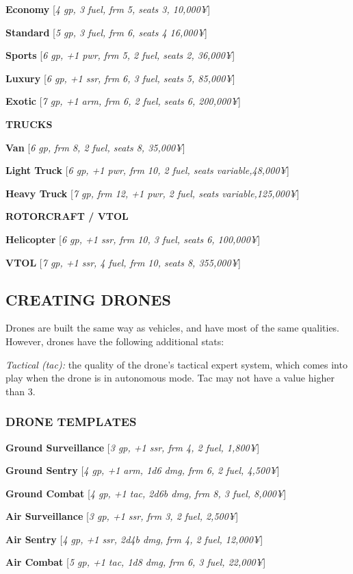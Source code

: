 \documentclass[oneside,10pt]{article}
\begin{document}
\begin{multicols}{2}
\textbf{Economy} [\textit{4 gp, 3 fuel, frm 5, seats 3, 10,000¥}]

\textbf{Standard} [\textit{5 gp, 3 fuel, frm 6, seats 4 16,000¥}]

\textbf{Sports} [\textit{6 gp, +1 pwr, frm 5, 2 fuel, seats 2, 36,000¥}]

\textbf{Luxury} [\textit{6 gp, +1 ssr, frm 6, 3 fuel, seats 5, 85,000¥}]

\textbf{Exotic} [\textit{7 gp, +1 arm, frm 6, 2 fuel, seats 6, 200,000¥}]

\textbf{TRUCKS}

\textbf{Van} [\textit{6 gp, frm 8, 2 fuel, seats 8, 35,000¥}]

\textbf{Light Truck} [\textit{6 gp, +1 pwr, frm 10, 2 fuel, seats variable,48,000¥}]

\textbf{Heavy Truck} [\textit{7 gp, frm 12, +1 pwr, 2 fuel, seats variable,125,000¥}]

\textbf{ROTORCRAFT / VTOL}

\textbf{Helicopter} [\textit{6 gp, +1 ssr, frm 10, 3 fuel, seats 6, 100,000¥}]

\textbf{VTOL} [\textit{7 gp, +1 ssr, 4 fuel, frm 10, seats 8, 355,000¥}]

\subsection{CREATING DRONES}
Drones are built the same way as vehicles, and have most
of the same qualities. However, drones have the following
additional stats:

\begin{adjustwidth*}{.5cm}{.5cm}
\textit{Tactical (tac):} the quality of the drone’s tactical expert system, which comes into play when the drone is in autonomous mode. Tac may not have a value higher than 3.
\end{adjustwidth*}

\subsubsection{DRONE TEMPLATES}
\textbf{Ground Surveillance} [\textit{3 gp, +1 ssr, frm 4, 2 fuel, 1,800¥}]

\textbf{Ground Sentry} [\textit{4 gp, +1 arm, 1d6 dmg, frm 6, 2 fuel, 4,500¥}]

\textbf{Ground Combat} [\textit{4 gp, +1 tac, 2d6b dmg, frm 8, 3 fuel, 8,000¥}]

\textbf{Air Surveillance} [\textit{3 gp, +1 ssr, frm 3, 2 fuel, 2,500¥}]

\textbf{Air Sentry} [\textit{4 gp, +1 ssr, 2d4b dmg, frm 4, 2 fuel, 12,000¥}]

\textbf{Air Combat} [\textit{5 gp, +1 tac, 1d8 dmg, frm 6, 3 fuel, 22,000¥}]

\end{multicols}
\end{document}
